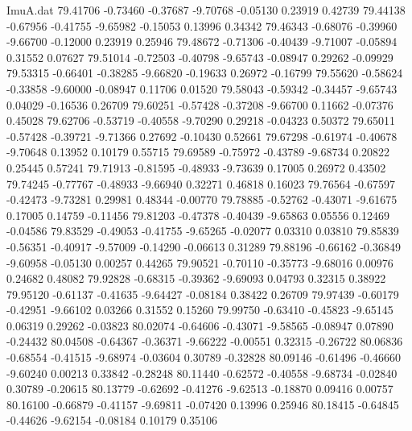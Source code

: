 \begin{filecontents}{ImuA.dat}
  79.41706   -0.73460   -0.37687   -9.70768   -0.05130    0.23919    0.42739
  79.44138   -0.67956   -0.41755   -9.65982   -0.15053    0.13996    0.34342
  79.46343   -0.68076   -0.39960   -9.66700   -0.12000    0.23919    0.25946
  79.48672   -0.71306   -0.40439   -9.71007   -0.05894    0.31552    0.07627
  79.51014   -0.72503   -0.40798   -9.65743   -0.08947    0.29262   -0.09929
  79.53315   -0.66401   -0.38285   -9.66820   -0.19633    0.26972   -0.16799
  79.55620   -0.58624   -0.33858   -9.60000   -0.08947    0.11706    0.01520
  79.58043   -0.59342   -0.34457   -9.65743    0.04029   -0.16536    0.26709
  79.60251   -0.57428   -0.37208   -9.66700    0.11662   -0.07376    0.45028
  79.62706   -0.53719   -0.40558   -9.70290    0.29218   -0.04323    0.50372
  79.65011   -0.57428   -0.39721   -9.71366    0.27692   -0.10430    0.52661
  79.67298   -0.61974   -0.40678   -9.70648    0.13952    0.10179    0.55715
  79.69589   -0.75972   -0.43789   -9.68734    0.20822    0.25445    0.57241
  79.71913   -0.81595   -0.48933   -9.73639    0.17005    0.26972    0.43502
  79.74245   -0.77767   -0.48933   -9.66940    0.32271    0.46818    0.16023
  79.76564   -0.67597   -0.42473   -9.73281    0.29981    0.48344   -0.00770
  79.78885   -0.52762   -0.43071   -9.61675    0.17005    0.14759   -0.11456
  79.81203   -0.47378   -0.40439   -9.65863    0.05556    0.12469   -0.04586
  79.83529   -0.49053   -0.41755   -9.65265   -0.02077    0.03310    0.03810
  79.85839   -0.56351   -0.40917   -9.57009   -0.14290   -0.06613    0.31289
  79.88196   -0.66162   -0.36849   -9.60958   -0.05130    0.00257    0.44265
  79.90521   -0.70110   -0.35773   -9.68016    0.00976    0.24682    0.48082
  79.92828   -0.68315   -0.39362   -9.69093    0.04793    0.32315    0.38922
  79.95120   -0.61137   -0.41635   -9.64427   -0.08184    0.38422    0.26709
  79.97439   -0.60179   -0.42951   -9.66102    0.03266    0.31552    0.15260
  79.99750   -0.63410   -0.45823   -9.65145    0.06319    0.29262   -0.03823
  80.02074   -0.64606   -0.43071   -9.58565   -0.08947    0.07890   -0.24432
  80.04508   -0.64367   -0.36371   -9.66222   -0.00551    0.32315   -0.26722
  80.06836   -0.68554   -0.41515   -9.68974   -0.03604    0.30789   -0.32828
  80.09146   -0.61496   -0.46660   -9.60240    0.00213    0.33842   -0.28248
  80.11440   -0.62572   -0.40558   -9.68734   -0.02840    0.30789   -0.20615
  80.13779   -0.62692   -0.41276   -9.62513   -0.18870    0.09416    0.00757
  80.16100   -0.66879   -0.41157   -9.69811   -0.07420    0.13996    0.25946
  80.18415   -0.64845   -0.44626   -9.62154   -0.08184    0.10179    0.35106

\end{filecontents}
